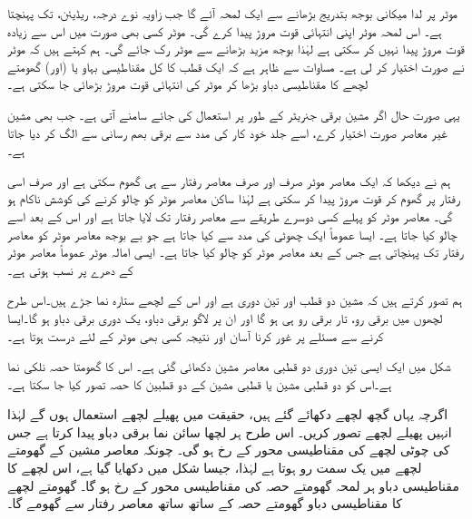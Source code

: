 موٹر پر لدا میکانی بوجھ بتدریج بڑھانے سے ایک لمحہ آئے گا  جب زاویہ  نوے درجہ،   ریڈیئن، تک پہنچتا ہے۔ اس لمحہ موٹر اپنی انتہائی قوت مروڑ  پیدا کرے  گی۔ موٹر کسی بھی صورت میں اس سے زیادہ قوت مروڑ پیدا نہیں کر سکتی ہے لہٰذا  بوجھ  مزید بڑھانے سے موٹر رک جائے گی۔ ہم کہتے ہیں کہ موٹر نے  صورت اختیار کر لی ہے۔ مساوات  سے ظاہر ہے کہ ایک قطب کا کل مقناطیسی بہاو یا (اور) گھومتے لچھے کا مقناطیسی دباو بڑھا کر موٹر کی  انتہائی قوت مروڑ  بڑھائی جا سکتی ہے۔

یہی صورت  حال اگر مشین برقی جنریٹر کے طور پر استعمال کی جائے سامنے آتی ہے۔ جب بھی مشین غیر معاصر صورت اختیار کرے،  اسے جلد خود کار   کی مدد سے برقی بھم  رسانی سے الگ کر دیا جاتا ہے۔

ہم نے دیکھا کہ ایک معاصر موٹر صرف اور صرف معاصر رفتار سے ہی گھوم سکتی ہے اور صرف اسی رفتار پر گھوم کر قوت مروڑ پیدا کر سکتی ہے لہٰذا ساکن معاصر موٹر کو  چالو  کرنے کی کوشش  ناکام ہو گی۔ معاصر موٹر کو پہلے کسی دوسرے طریقے سے معاصر رفتار تک لایا جاتا ہے اور اس کے بعد  اسے چالو کیا جاتا ہے۔ ایسا عموماً ایک چھوٹی   کی مدد سے کیا جاتا ہے جو بے بوجھ معاصر موٹر کو  معاصر رفتار تک پہنچاتی  ہے جس کے بعد معاصر موٹر کو چالو کیا جاتا ہے۔ ایسی امالہ موٹر عموماً معاصر موٹر کے دھرے پر نسب ہوتی ہے۔

 ہم تصور کرتے ہیں کہ مشین دو قطب اور تین دوری ہے اور اس کے لچھے ستارہ نما جڑے  ہیں۔اس طرح لچھوں میں برقی رو، تار برقی رو ہی ہو گا اور ان پر لاگو برقی دباو، یک دوری برقی دباو ہو گا۔ایسا کرنے سے مسئلے پر غور کرنا آسان  اور نتیجہ کسی بھی موٹر کے لئے درست ہوتا ہے۔

شکل   میں ایک ایسی تین دوری دو قطبی معاصر مشین دکھائی گئی ہے۔ اس کا گھومتا حصہ نلکی نما ہے۔اس کو دو قطبی مشین یا   قطبی مشین کے دو قطبین کا حصہ تصور کیا جا سکتا ہے۔

 اگرچہ یہاں گچھ لچھے دکھائے گئے ہیں، حقیقت میں پھیلے لچھے  استعمال ہوں گے لہٰذا انہیں  پھیلے لچھے تصور کریں۔ اس طرح ہر لچھا سائن نما برقی دباو پیدا کرتا ہے جس کی چوٹی لچھے کی مقناطیسی محور کے رخ ہو گی۔  چونکہ معاصر مشین کے گھومتے لچھے میں یک سمت  رو ہوتا ہے لہٰذا، جیسا شکل  میں دکھایا گیا ہے، اس لچھے  کا مقناطیسی دباو ہر لمحہ گھومتے حصہ کی مقناطیسی محور کے رخ ہو گا۔ گھومتے لچھے کا مقناطیسی دباو گھومتے حصہ کے ساتھ ساتھ معاصر رفتار سے گھومے گا۔

